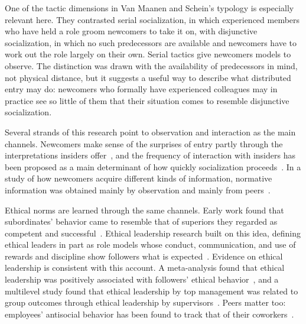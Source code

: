 \documentclass[12pt,a4paper]{article}
\theoremstyle{definition}
\begin{document}
One of the tactic dimensions in Van Maanen and Schein's typology is especially relevant here. They contrasted serial socialization, in which experienced members who have held a role groom newcomers to take it on, with disjunctive socialization, in which no such predecessors are available and newcomers have to work out the role largely on their own. Serial tactics give newcomers models to observe. The distinction was drawn with the availability of predecessors in mind, not physical distance, but it suggests a useful way to describe what distributed entry may do: newcomers who formally have experienced colleagues may in practice see so little of them that their situation comes to resemble disjunctive socialization.

Several strands of this research point to observation and interaction as the main channels. Newcomers make sense of the surprises of entry partly through the interpretations insiders offer~\citep{louis1980surprise}, and the frequency of interaction with insiders has been proposed as a main determinant of how quickly socialization proceeds~\citep{reichers1987interactionist}. In a study of how newcomers acquire different kinds of information, normative information was obtained mainly by observation and mainly from peers~\citep{morrison1993newcomer}.

Ethical norms are learned through the same channels. Early work found that subordinates' behavior came to resemble that of superiors they regarded as competent and successful~\citep{weiss1977subordinate}. Ethical leadership research built on this idea, defining ethical leaders in part as role models whose conduct, communication, and use of rewards and discipline show followers what is expected~\citep{brown2005ethical,brown2006ethical}. Evidence on ethical leadership is consistent with this account. A meta-analysis found that ethical leadership was positively associated with followers' ethical behavior~\citep{bedi2016meta}, and a multilevel study found that ethical leadership by top management was related to group outcomes through ethical leadership by supervisors~\citep{mayer2009how}. Peers matter too: employees' antisocial behavior has been found to track that of their coworkers~\citep{robinson1998monkey}.
\end{document}
